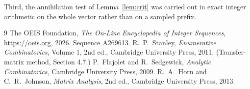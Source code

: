 \documentclass[11pt,a4paper]{article}
\theoremstyle{plain}
\theoremstyle{definition}
\begin{document}
Third, the annihilation test of Lemma~\ref{lem:crit} was carried out in exact integer
arithmetic on the whole vector rather than on a sampled prefix.

\begin{thebibliography}{9}
 The OEIS Foundation, \emph{The On-Line Encyclopedia of Integer
Sequences}, \url{https://oeis.org}, 2026. Sequence A269613.
 R.~P.~Stanley, \emph{Enumerative Combinatorics}, Volume 1, 2nd ed.,
Cambridge University Press, 2011. (Transfer-matrix method, Section 4.7.)
 P.~Flajolet and R.~Sedgewick, \emph{Analytic Combinatorics}, Cambridge
University Press, 2009.
 R.~A.~Horn and C.~R.~Johnson, \emph{Matrix Analysis}, 2nd ed., Cambridge
University Press, 2013.
\end{thebibliography}
\end{document}
